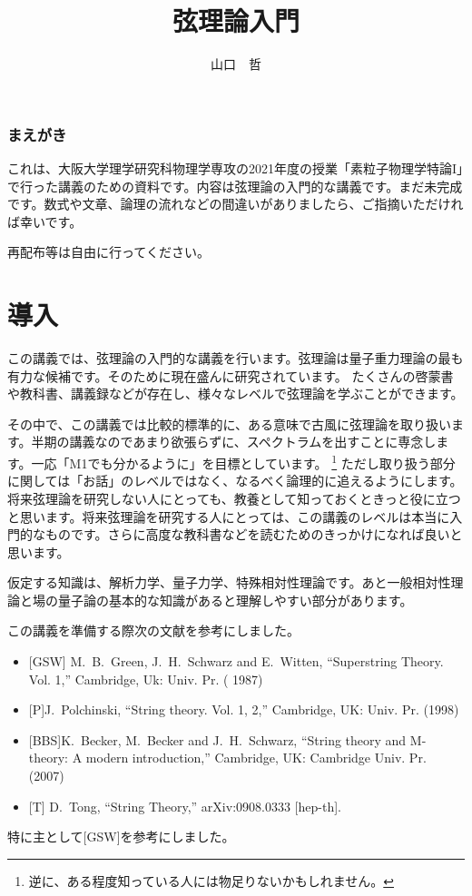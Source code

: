 \documentclass[report,paper=a4, fontsize=12pt, line_length=16cm, number_of_lines=33,dvipdfmx]{jlreq}
\numberwithin{equation}{chapter}
\numberwithin{equation}{section}
\begin{document}
\title{弦理論入門}
\author{山口　哲}
\maketitle
\tableofcontents
\subsection*{まえがき}
これは、大阪大学理学研究科物理学専攻の2021年度の授業「素粒子物理学特論I」で行った講義のための資料です。内容は弦理論の入門的な講義です。まだ未完成です。数式や文章、論理の流れなどの間違いがありましたら、ご指摘いただければ幸いです。

再配布等は自由に行ってください。

\chapter{導入}
この講義では、弦理論の入門的な講義を行います。弦理論は量子重力理論の最も有力な候補です。そのために現在盛んに研究されています。
たくさんの啓蒙書や教科書、講義録などが存在し、様々なレベルで弦理論を学ぶことができます。

その中で、この講義では比較的標準的に、ある意味で古風に弦理論を取り扱います。半期の講義なのであまり欲張らずに、スペクトラムを出すことに専念します。一応「M1でも分かるように」を目標としています。
\footnote{逆に、ある程度知っている人には物足りないかもしれません。}
ただし取り扱う部分に関しては「お話」のレベルではなく、なるべく論理的に追えるようにします。将来弦理論を研究しない人にとっても、教養として知っておくときっと役に立つと思います。将来弦理論を研究する人にとっては、この講義のレベルは本当に入門的なものです。さらに高度な教科書などを読むためのきっかけになれば良いと思います。

仮定する知識は、解析力学、量子力学、特殊相対性理論です。あと一般相対性理論と場の量子論の基本的な知識があると理解しやすい部分があります。

この講義を準備する際次の文献を参考にしました。
\begin{itemize}
 \item {} [GSW] M.~B.~Green, J.~H.~Schwarz and E.~Witten,
  ``Superstring Theory. Vol. 1,''
  Cambridge, Uk: Univ. Pr. ( 1987) 
\item {}[P]J.~Polchinski,
  ``String theory. Vol. 1, 2,''
  Cambridge, UK: Univ. Pr. (1998)
 \item {}[BBS]K.~Becker, M.~Becker and J.~H.~Schwarz,
  ``String theory and M-theory: A modern introduction,''
  Cambridge, UK: Cambridge Univ. Pr. (2007)
\item {}[T] D.~Tong,
  ``String Theory,''
  arXiv:0908.0333 [hep-th].
\end{itemize}
特に主として[GSW]を参考にしました。
\end{document}
